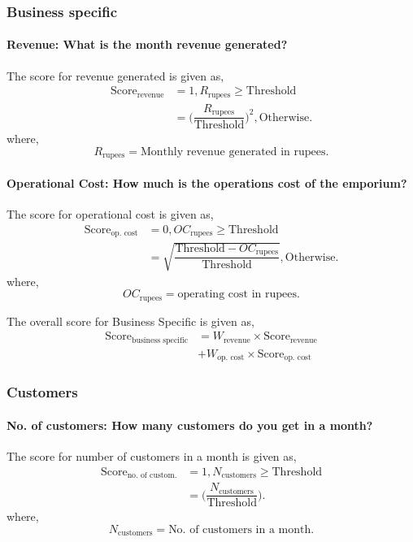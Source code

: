 \documentclass[oneside,twocolumn]{article}
\newcommand{\tsub}[2]{\text{#1}_{\text{#2}}}
\newcommand{\tsubb}[2]{#1_{\text{#2}}}
\begin{document}
\subsubsection{Business specific}
\paragraph{Revenue: What is the month revenue generated?}
The score for revenue generated is given as,
\begin{align*}
	\tsub{Score}{revenue} &= 1, \tsubb{R}{rupees} \ge \text{Threshold} \\
	&= \Big( \dfrac{\tsubb{R}{rupees}}{\text{Threshold}} \Big)^{2}, \text{Otherwise}.
\end{align*}
where,
\[
	\tsubb{R}{rupees} = \text{Monthly revenue generated in rupees}.
\]	
\paragraph{Operational Cost: How much is the operations cost of the emporium?}
The score for operational cost is given as,
\begin{align*}
	\tsub{Score}{op. cost} &= 0, \tsubb{OC}{rupees} \ge \text{Threshold} \\
	&= \sqrt{\dfrac{\text{Threshold}-\tsubb{OC}{rupees}}{\text{Threshold}}}, \text{Otherwise}.
\end{align*}
where,
\[
	\tsubb{OC}{rupees} = \text{operating cost in rupees}.
\]	

The overall score for Business Specific is given as,
\begin{align*}
	\tsub{Score}{business specific} &= \tsubb{W}{revenue} \times \tsub{Score}{revenue} \\
	&+ \tsubb{W}{op. cost} \times \tsub{Score}{op. cost}
\end{align*}

\subsubsection{Customers}
\paragraph{No. of customers: How many customers do you get in a month?}
The score for number of customers in a month is given as,
\begin{align*}
	\tsub{Score}{no. of custom.} &= 1, \tsubb{N}{customers} \ge \text{Threshold} \\
	&= \Big(\dfrac{\tsubb{N}{customers}}{\text{Threshold}}\Big).
\end{align*}
where,
\[
	\tsubb{N}{customers} = \text{No. of customers in a month.}
\]
\end{document}
